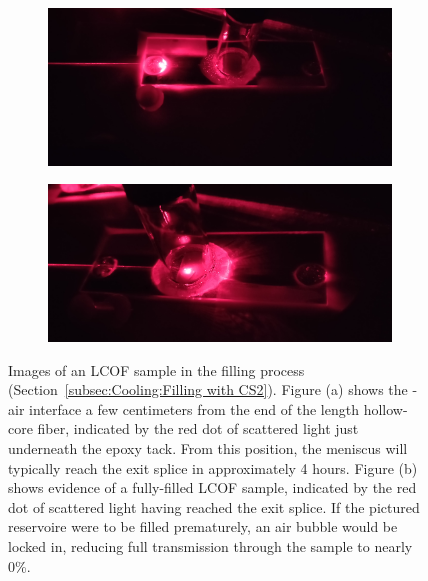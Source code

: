 \begin{figure}[t]
    \centering
    \begin{subfigure}[b]{0.49\textwidth}
        \centering
        \includegraphics[width=\textwidth]{figs/3-Cooling/CS2NearlyReached.jpg}
        \caption{}
        \label{fig:Cooling:CS2 Nearly Reached}
    \end{subfigure}
    \hfill
    \begin{subfigure}[b]{0.49\textwidth}
        \centering
        \includegraphics[width=\textwidth]{figs/3-Cooling/CS2Reached.jpg}
        \caption{}
        \label{fig:Cooling:CS2 Reached}
    \end{subfigure}
    \caption{Images of an \ac{LCOF} sample in the filling process (Section~\ref{subsec:Cooling:Filling with CS2}). Figure (a) shows the -air interface a few centimeters from the end of the length hollow-core fiber, indicated by the red dot of scattered light just underneath the epoxy tack. From this position, the meniscus will typically reach the exit splice in approximately 4 hours. Figure (b) shows evidence of a fully-filled \ac{LCOF} sample, indicated by the red dot of scattered light having reached the exit splice. If the pictured reservoire were to be filled prematurely, an air bubble would be locked in, reducing full transmission through the sample to nearly 0\%.}
    \label{fig:Cooling:red dot monitoring near the end}
\end{figure}

